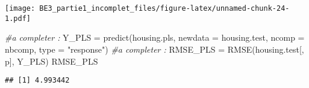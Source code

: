 \documentclass[
]{article}
\newenvironment{Shaded}{\begin{snugshade}}{\end{snugshade}}
\newcommand{\AttributeTok}[1]{\textcolor[rgb]{0.77,0.63,0.00}{#1}}
\newcommand{\CommentTok}[1]{\textcolor[rgb]{0.56,0.35,0.01}{\textit{#1}}}
\newcommand{\FunctionTok}[1]{\textcolor[rgb]{0.00,0.00,0.00}{#1}}
\newcommand{\NormalTok}[1]{#1}
\newcommand{\OtherTok}[1]{\textcolor[rgb]{0.56,0.35,0.01}{#1}}
\newcommand{\StringTok}[1]{\textcolor[rgb]{0.31,0.60,0.02}{#1}}
\begin{document}
\texttt{[image: BE3\_partie1\_incomplet\_files/figure-latex/unnamed-chunk-24-1.pdf]}

\begin{Shaded}
\begin{Highlighting}[]
\CommentTok{\#a completer :}
\NormalTok{Y\_PLS }\OtherTok{=} \FunctionTok{predict}\NormalTok{(housing.pls, }\AttributeTok{newdata =}\NormalTok{ housing.test, }\AttributeTok{ncomp =}\NormalTok{ nbcomp, }\AttributeTok{type =} \StringTok{"response"}\NormalTok{)}
\CommentTok{\#a completer :}
\NormalTok{RMSE\_PLS }\OtherTok{=} \FunctionTok{RMSE}\NormalTok{(housing.test[, p], Y\_PLS)}
\NormalTok{RMSE\_PLS}
\end{Highlighting}
\end{Shaded}

\begin{verbatim}
## [1] 4.993442
\end{verbatim}
\end{document}

